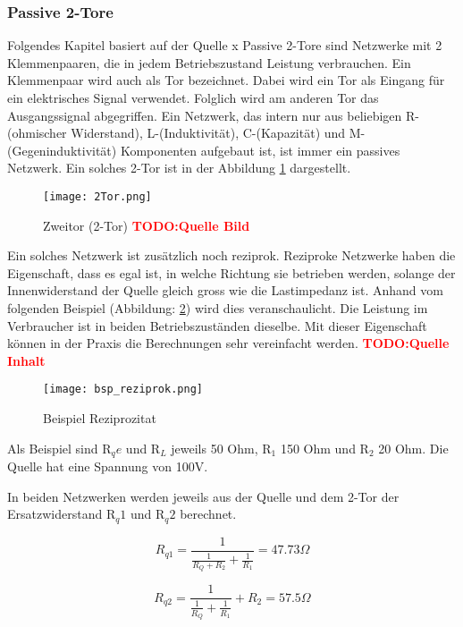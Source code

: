  \subsubsection{Passive 2-Tore} \label{subsubsec:2tore}
 Folgendes Kapitel basiert auf der Quelle x 
Passive 2-Tore sind Netzwerke mit 2 Klemmenpaaren, die in jedem Betriebszustand Leistung verbrauchen. Ein Klemmenpaar wird auch als Tor bezeichnet. Dabei wird ein Tor als Eingang für ein elektrisches Signal verwendet. Folglich wird am anderen Tor das Ausgangssignal abgegriffen. Ein Netzwerk, das intern nur aus beliebigen R-(ohmischer Widerstand), L-(Induktivität), C-(Kapazität) und M-(Gegeninduktivität) Komponenten aufgebaut ist, ist immer ein passives Netzwerk. Ein solches 2-Tor ist in der Abbildung \ref{fig:2tor} dargestellt.

\begin{figure}[H]
	\centering
	\texttt{[image: 2Tor.png]}
	\caption{Zweitor (2-Tor) \textcolor{red}{\textbf{TODO:Quelle Bild}} }
	\label{fig:2tor}
\end{figure}

Ein solches Netzwerk ist zusätzlich noch reziprok. Reziproke Netzwerke haben die Eigenschaft, dass es egal ist, in welche Richtung sie betrieben werden, solange der Innenwiderstand der Quelle gleich gross wie die Lastimpedanz ist. Anhand vom folgenden Beispiel (Abbildung: \ref{fig:reziprozitat}) wird dies veranschaulicht. Die Leistung im Verbraucher ist in beiden Betriebszuständen dieselbe. Mit dieser Eigenschaft können in der  Praxis die Berechnungen sehr vereinfacht werden. \textcolor{red}{\textbf{TODO:Quelle Inhalt}}

\begin{figure}[H]
	\centering
	\texttt{[image: bsp\_reziprok.png]}
	\caption{Beispiel Reziprozitat}
	\label{fig:reziprozitat}
\end{figure}


Als Beispiel sind R$_qe$ und R$_L$ jeweils 50 Ohm, R$_1$ 150 Ohm und R$_2$ 20 Ohm. Die Quelle hat eine Spannung von 100V.

In beiden Netzwerken werden jeweils aus der Quelle und dem 2-Tor der Ersatzwiderstand  R$_q1$ und R$_q2$ berechnet.

\begin{equation}\label{equ:rqe1}
			R_{q1} = \frac{1}{\frac{1}{R_Q+R_2}+\frac{1}{R_1}} =  47.73 \Omega 
		\end{equation}
		
\begin{equation}\label{equ:rqe2}
			R_{q2} = \frac{1}{\frac{1}{R_Q}+\frac{1}{R_1}} +R_2 =  57.5 \Omega 
		\end{equation}

